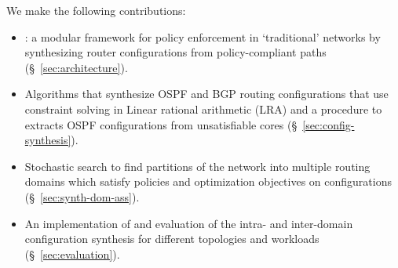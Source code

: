  We make the following contributions:
\begin{itemize}
	\item \name: a modular framework 
	for policy enforcement in `traditional' networks
	by synthesizing router configurations from policy-compliant paths (\S~\ref{sec:architecture}). 
	\item Algorithms that synthesize OSPF and BGP routing configurations that use
	constraint solving in Linear rational arithmetic (LRA) and 
	a procedure to extracts OSPF configurations from 
	unsatisfiable cores (\S~\ref{sec:config-synthesis}). 
	\item Stochastic search to find 
	partitions of the network into multiple routing domains which
	satisfy policies and optimization objectives on configurations (\S~\ref{sec:synth-dom-ass}).
	\item An implementation of \name and evaluation of the 
	intra- and inter-domain configuration synthesis for different
	topologies and workloads (\S~\ref{sec:evaluation}). 
\end{itemize}
